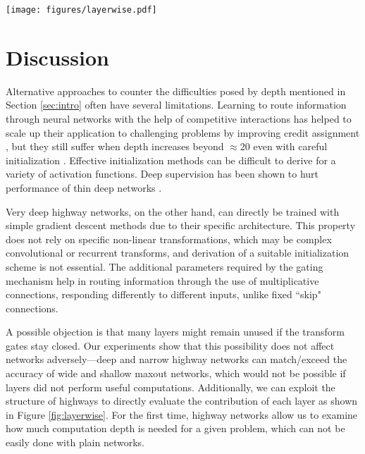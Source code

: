 \documentclass{article}
\begin{document}
\begin{figure*}[t]
\texttt{[image: figures/layerwise.pdf]}
\caption{Lesioned training set performance (y-axis) of the best 50-layer highway networks on MNIST (left) and CIFAR-100 (right), as a function of the lesioned layer (x-axis). Evaluated on the full training set while forcefully closing all the transform gates of a single layer at a time. The non-lesioned performance is indicated as a dashed line at the bottom.}
\label{fig:layerwise}
\end{figure*}


\section{Discussion}
Alternative approaches to counter the difficulties posed by depth mentioned in Section \ref{sec:intro} often have several limitations. Learning to route information through neural networks with the help of competitive interactions has helped to scale up their application to challenging problems by improving credit assignment \cite{Srivastava2015a}, but they still suffer when depth increases beyond $\approx$20 even with careful initialization \cite{He2015}. Effective initialization methods can be difficult to derive for a variety of activation functions. Deep supervision \cite{Lee2015} has been shown to hurt performance of thin deep networks \cite{Romero2014}. 

Very deep highway networks, on the other hand, can directly be trained with simple gradient descent methods due to their specific architecture. This property does not rely on specific non-linear transformations, which may be complex convolutional or recurrent transforms, and derivation of a suitable initialization scheme is not essential.
The additional parameters required by the gating mechanism help in routing information through the use of multiplicative connections, responding differently to different inputs, unlike fixed ``skip" connections.

A possible objection is that many layers might remain unused if the transform gates stay closed. Our experiments show that this possibility does not affect networks adversely---deep and narrow highway networks can match/exceed the accuracy of wide and shallow maxout networks, which would not be possible if layers did not perform useful computations. Additionally, we can exploit the structure of highways to directly evaluate the contribution of each layer as shown in Figure \ref{fig:layerwise}. For the first time, highway networks allow us to examine how much computation depth is needed for a given problem, which can not be easily done with plain networks. 
\end{document}
